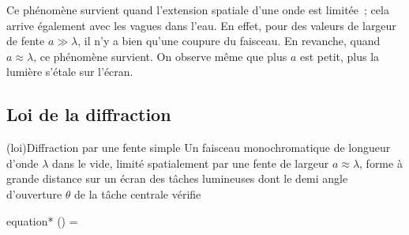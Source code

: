 \documentclass[../../main/main.tex]{subfiles}
\begin{document}
Ce phénomène survient quand l'extension spatiale d'une onde est limitée~; cela
arrive également avec les vagues dans l'eau. En effet, pour des valeurs de
largeur de fente $a \gg \lambda$, il n'y a bien qu'une coupure du faisceau. En
revanche, quand $a \approx \lambda$, ce phénomène survient. On observe même que
plus $a$ est petit, plus la lumière s'étale sur l'écran.

\subsection{Loi de la diffraction}

\begin{tcb}(loi){Diffraction par une fente simple}
	Un faisceau monochromatique de longueur d'onde $\lambda$ dans le vide,
	limité spatialement par une fente de largeur $a \approx \lambda$, forme à
	grande distance sur un écran des tâches lumineuses dont le demi angle
	d'ouverture $\theta$ de la tâche centrale vérifie
	\begin{empheq}[box=\fbox]{equation*}
		\sin(\theta) = 
	\end{empheq}
\end{tcb}


\end{document}
